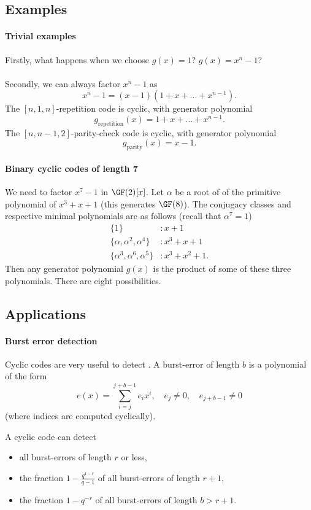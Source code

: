 \documentclass[a4paper, 11pt, openany]{book}
\begin{document}
\subsection{Examples}

\paragraph{Trivial examples}
Firstly, what happens when we choose $g(x) = 1$? $g(x) = x^n - 1$?\\
~\\
Secondly, we can always factor $x^n-1$ as
\[
	x^n - 1 = (x-1)(1 + x + \dots + x^{n-1}).
\]
The $[n,1,n]$-repetition code is cyclic, with generator polynomial
\[
	g_{\mathrm{repetition}}(x) = 1 + x + \dots + x^{n-1}.
\]
The $[n,n-1,2]$-parity-check code is cyclic, with generator polynomial
\[
	g_{\mathrm{parity}}(x) = x - 1.
\]



\paragraph{Binary cyclic codes of length 7}
We need to factor $x^7 - 1$ in $\GF(2)[x]$. Let $\alpha$ be a root of of the primitive polynomial of $x^3 + x + 1$ (this generates $\GF(8)$). The conjugacy classes and respective minimal polynomials are as follows (recall that $\alpha^7 = 1$)
\begin{align*}
	\{1\} &: x + 1\\
	\{ \alpha, \alpha^2, \alpha^4\} &: x^3 + x + 1\\
	\{ \alpha^3, \alpha^6, \alpha^5\} &: x^3 + x^2 + 1.
\end{align*}
Then any generator polynomial $g(x)$ is the product of some of these three polynomials. There are eight possibilities.

\subsection{Applications}

\paragraph{Burst error detection}
Cyclic codes are very useful to detect . A burst-error of length $b$ is a polynomial of the form
\[
	e(x) = \sum_{i=j}^{j + b - 1} e_i x^i, \quad e_j \ne 0, \quad e_{j+b-1} \ne 0
\]
(where indices are computed cyclically).

A cyclic code can detect
\begin{itemize}
	\item all burst-errors of length $r$ or less,

	\item the fraction $1 - \frac{q^{1-r}}{q-1}$ of all burst-errors of length $r+1$,

	\item the fraction $1 - q^{-r}$ of all burst-errors of length $b > r+1$.
\end{itemize}
\end{document}
